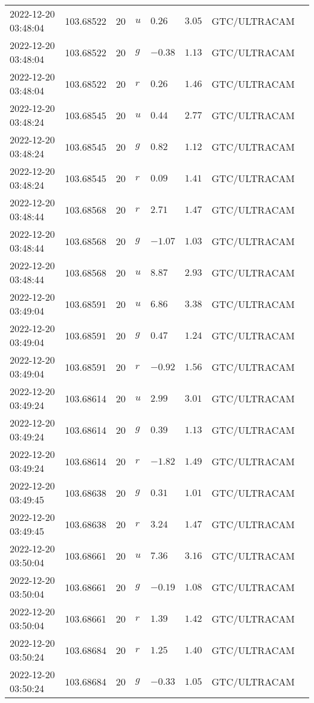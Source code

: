 \documentclass{nature_plusfigure}
\begin{document}
\begin{supplement}
\begin{center}
\begin{longtable}{llllllll}
2022-12-20 03:48:04 & 103.68522 & 20 & $u$ & $0.26$ & $3.05$ & GTC/ULTRACAM &  \\ 
2022-12-20 03:48:04 & 103.68522 & 20 & $g$ & $-0.38$ & $1.13$ & GTC/ULTRACAM &  \\ 
2022-12-20 03:48:04 & 103.68522 & 20 & $r$ & $0.26$ & $1.46$ & GTC/ULTRACAM &  \\ 
2022-12-20 03:48:24 & 103.68545 & 20 & $u$ & $0.44$ & $2.77$ & GTC/ULTRACAM &  \\ 
2022-12-20 03:48:24 & 103.68545 & 20 & $g$ & $0.82$ & $1.12$ & GTC/ULTRACAM &  \\ 
2022-12-20 03:48:24 & 103.68545 & 20 & $r$ & $0.09$ & $1.41$ & GTC/ULTRACAM &  \\ 
2022-12-20 03:48:44 & 103.68568 & 20 & $r$ & $2.71$ & $1.47$ & GTC/ULTRACAM &  \\ 
2022-12-20 03:48:44 & 103.68568 & 20 & $g$ & $-1.07$ & $1.03$ & GTC/ULTRACAM &  \\ 
2022-12-20 03:48:44 & 103.68568 & 20 & $u$ & $8.87$ & $2.93$ & GTC/ULTRACAM &  \\ 
2022-12-20 03:49:04 & 103.68591 & 20 & $u$ & $6.86$ & $3.38$ & GTC/ULTRACAM &  \\ 
2022-12-20 03:49:04 & 103.68591 & 20 & $g$ & $0.47$ & $1.24$ & GTC/ULTRACAM &  \\ 
2022-12-20 03:49:04 & 103.68591 & 20 & $r$ & $-0.92$ & $1.56$ & GTC/ULTRACAM &  \\ 
2022-12-20 03:49:24 & 103.68614 & 20 & $u$ & $2.99$ & $3.01$ & GTC/ULTRACAM &  \\ 
2022-12-20 03:49:24 & 103.68614 & 20 & $g$ & $0.39$ & $1.13$ & GTC/ULTRACAM &  \\ 
2022-12-20 03:49:24 & 103.68614 & 20 & $r$ & $-1.82$ & $1.49$ & GTC/ULTRACAM &  \\ 
2022-12-20 03:49:45 & 103.68638 & 20 & $g$ & $0.31$ & $1.01$ & GTC/ULTRACAM &  \\ 
2022-12-20 03:49:45 & 103.68638 & 20 & $r$ & $3.24$ & $1.47$ & GTC/ULTRACAM &  \\ 
2022-12-20 03:50:04 & 103.68661 & 20 & $u$ & $7.36$ & $3.16$ & GTC/ULTRACAM &  \\ 
2022-12-20 03:50:04 & 103.68661 & 20 & $g$ & $-0.19$ & $1.08$ & GTC/ULTRACAM &  \\ 
2022-12-20 03:50:04 & 103.68661 & 20 & $r$ & $1.39$ & $1.42$ & GTC/ULTRACAM &  \\ 
2022-12-20 03:50:24 & 103.68684 & 20 & $r$ & $1.25$ & $1.40$ & GTC/ULTRACAM &  \\ 
2022-12-20 03:50:24 & 103.68684 & 20 & $g$ & $-0.33$ & $1.05$ & GTC/ULTRACAM &  \\ 

\end{longtable}
\end{center}
\end{supplement}
\end{document}
